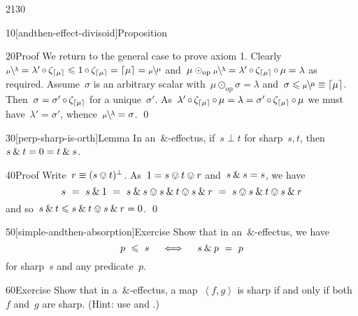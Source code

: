 \begin{parsec}{2130}
\begin{point}{10}[andthen-effect-divisoid]{Proposition}
\begin{point}{20}{Proof}
We return to the general case to prove axiom 1.
Clearly~$\rfrac{\lambda}{\mu} = \lambda' \after \zeta_{\ceil{\mu}}
            \leq 1 \after \zeta_{\ceil{\mu}} = \ceil{\mu} 
            = \rfrac{\mu}{\mu}$
    and~$\mu \odot_{\mathrm{op}} \rfrac{\lambda}{\mu}
= \lambda'  \after \zeta_{\ceil{\mu}} \after \mu = \lambda$
as required.
Assume~$\sigma$ is an arbitrary
    scalar with~$\mu \odot_{\mathrm{op}} \sigma = \lambda$
    and~$\sigma \leq \rfrac{\mu}{\mu} \equiv \ceil{\mu}$.
Then~$\sigma = \sigma' \mathop{\circ} \zeta_{\left\lceil\mu\right\rceil}$
    for a unique~$\sigma'$.
As~$
\lambda'  \mathop{\circ} \zeta_{\left\lceil\mu\right\rceil} \mathop{\circ} \mu = \lambda
= \sigma' \mathop{\circ} \zeta_{\left\lceil\mu\right\rceil} \mathop{\circ} \mu$
we must have~$\lambda' = \sigma'$, whence~$\rfrac{\lambda}{\mu}=\sigma$. \qed
\end{point}
\end{point}
\begin{point}{30}[perp-sharp-is-orth]{Lemma}%
In an~$\&$-effectus, if~$s \perp t$
    for sharp~$s,t$, then~$s \mathbin{\&} t = 0 = t \mathbin{\&} s$.
\begin{point}{40}{Proof}%
Write~$r \equiv (s \ovee t)^\perp$.
    As~$1 = s \ovee t \ovee r$ and~$s \mathbin{\&} s=s$, we have
\begin{equation*}
    s \ = \ 
    \andthen{s}{1} \ = \ 
    \andthen{s}{s} \ovee \andthen{s}{t} \ovee \andthen{s}{r} \ = \ 
    s \ovee \andthen{s}{t} \ovee \andthen{s}{r}
\end{equation*}
and so~$s \mathbin{\&} t \leqslant s \mathbin{\&} t \ovee s \mathbin{\&} r = 0$. \qed
\end{point}
\end{point}
\begin{point}{50}[simple-andthen-absorption]{Exercise}%
Show that in an~$\&$-effectus, we have
\begin{equation*}
p \ \leqslant\  s \quad \iff \quad s \mathbin{\&} p \ =\  p
\end{equation*}
for sharp~$s$ and any predicate~$p$.
\end{point}
\begin{point}{60}{Exercise}%
Show that in a~$\&$-effectus,
    a map~$\left<f,g\right>$
    is sharp if and only if both~$f$ and~$g$ are sharp.
    (Hint: use  and .)
\end{point}
\end{parsec}


